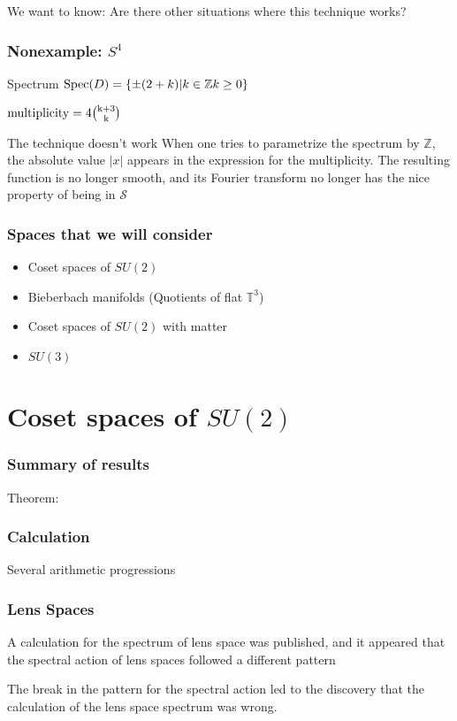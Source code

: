 \documentclass{beamer}
\def\Z{{\mathbb Z}}
\def\cS{{\mathcal S}}
\def\Spec{{\rm Spec}}
\begin{document}
\begin{frame}
	\begin{block}{}
	We want to know: Are there other situations where this technique works?
	\end{block}
\end{frame}

\begin{frame}
	\frametitle{Nonexample: $S^4$}
	\begin{block}{Spectrum}
		$\Spec(D) = \{\pm (2 + k) | k \in \Z k \geq 0 \}$

		$\rm{multiplicity} = 4 {{k+3} \choose {k}}$
	\end{block}

	\pause

	\begin{alertblock}{The technique doesn't work}
		When one tries to parametrize the spectrum by $\Z$, the absolute value $|x|$ appears in the expression for the multiplicity. The resulting function is no longer smooth, and its Fourier transform no longer has the nice property of being in $\cS$
	\end{alertblock}
\end{frame}

\begin{frame}
	\frametitle{Spaces that we will consider}
	\begin{itemize}
		\item Coset spaces of $SU(2)$
		\item Bieberbach manifolds (Quotients of flat $\mathbb{T} ^3$)
		\item Coset spaces of $SU(2)$ with matter
		\item $SU(3)$
	\end{itemize}

\end{frame}

\section{Coset spaces of $SU(2)$}
\begin{frame}
	\frametitle{Summary of results}
	Theorem:
\end{frame}

\begin{frame}
	\frametitle{Calculation}
	Several arithmetic progressions
\end{frame}

\begin{frame}
	\frametitle{Lens Spaces}
	\begin{block}{}
		A calculation for the spectrum of lens space was published, and it appeared that the spectral action of lens spaces followed a different pattern
	\end{block}

	\pause

	\begin{block}{}
		The break in the pattern for the spectral action led to the discovery that the calculation of the lens space spectrum was wrong.
	\end{block}
\end{frame}
\end{document}
